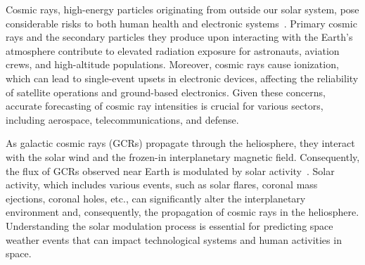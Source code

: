 \documentclass[twocolumn,,12pt]{aastex631}
\begin{document}
Cosmic rays, high-energy particles originating from outside our solar system, pose considerable risks to both human health and electronic systems~\cite{cucinotta2014space,simonsen2020nasa,de2020crater,chen2023astronaut}. Primary cosmic rays and the secondary particles they produce upon interacting with the Earth's atmosphere contribute to elevated radiation exposure for astronauts, aviation crews, and high-altitude populations. Moreover, cosmic rays cause ionization, which can lead to single-event upsets in electronic devices, affecting the reliability of satellite operations and ground-based electronics. Given these concerns, accurate forecasting of cosmic ray intensities is crucial for various sectors, including aerospace, telecommunications, and defense.

As galactic cosmic rays (GCRs) propagate through the heliosphere, they interact with the solar wind and the frozen-in interplanetary magnetic field. Consequently, the flux of GCRs observed near Earth is modulated by solar activity~\cite{parker1965passage,quenby1984theory,simpson1998brief,luo2011cosmic,kota2013theory,luo2013galactic,potgieter2013solar,potgieter2014very,o2015badhwar,vos2015new,vos2016global,luo2017numerical,potgieter2017global,shen2019modulation,luo2020numerical,aguilar2021periodicities,song2021numerical}. Solar activity, which includes various events, such as solar flares, coronal mass ejections, coronal holes, etc., can significantly alter the interplanetary environment and, consequently, the propagation of cosmic rays in the heliosphere. Understanding the solar modulation process is essential for predicting space weather events that can impact technological systems and human activities in space.
\end{document}
